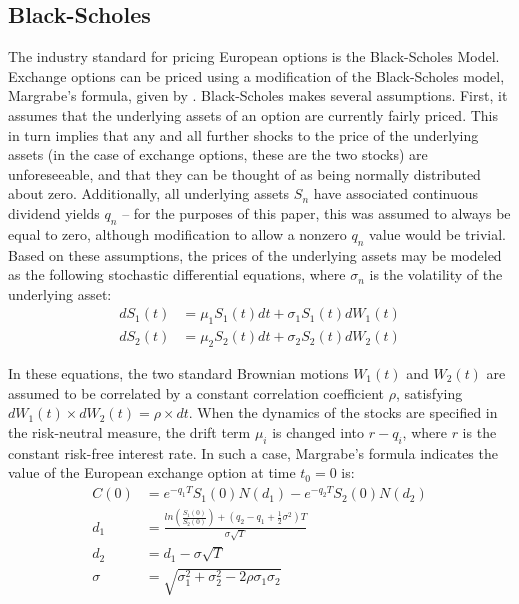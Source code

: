 \documentclass{article}
\begin{document}
\subsection{Black-Scholes}
    The industry standard for pricing European options is the Black-Scholes Model. Exchange options can be priced using a modification of the Black-Scholes model, Margrabe's formula, given by \cite{margrabe78}. Black-Scholes makes several assumptions. First, it assumes that the underlying assets of an option are currently fairly priced. This in turn implies that any and all further shocks to the price of the underlying assets (in the case of exchange options, these are the two stocks) are unforeseeable, and that they can be thought of as being normally distributed about zero. Additionally, all underlying assets $S_n$ have associated continuous dividend yields $q_n$ -- for the purposes of this paper, this was assumed to always be equal to zero, although modification to allow a nonzero $q_n$ value would be trivial. Based on these assumptions, the prices of the underlying assets may be modeled as the following stochastic differential equations, where $\sigma_n$ is the volatility of the underlying asset:
	\begin{align*}
	dS_1(t) &= \mu_1 S_1(t) dt + \sigma_1 S_1(t) dW_1(t) \\
	dS_2(t) &= \mu_2 S_2(t) dt + \sigma_2 S_2(t) dW_2(t)
	\end{align*}	
	
	In these equations, the two standard Brownian motions $W_1(t)$ and $W_2(t)$ are assumed to be correlated by a constant correlation coefficient $\rho$, satisfying $dW_1(t) \times dW_2(t) = \rho \times dt$. When the dynamics of the stocks are specified in the risk-neutral measure, the drift term $\mu_i$ is changed into $r-q_i$, where $r$ is the constant risk-free interest rate. In such a case, Margrabe's formula indicates the value of the European exchange option at time $t_0=0$ is:
	\begin{align*}
	C(0) &= e^{-q_1 T} S_1(0) N(d_1) - e^{-q_2 T} S_2(0) N(d_2) \\
	d_1 &= \frac{ln(\frac{S_1(0)}{S_2(0)}) + (q_2 - q_1 + \frac{1}{2} \sigma^2) T}{\sigma \sqrt{T}} \\
	d_2 &= d_1 - \sigma \sqrt{T} \\
	\sigma &= \sqrt{\sigma_1^2 + \sigma_2^2 - 2 \rho \sigma_1 \sigma_2}
	\end{align*}	
	
\end{document}
